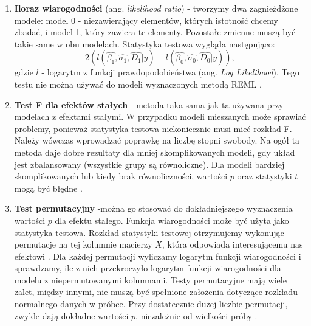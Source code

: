 \documentclass[12pt]{mwbk}
\theoremstyle{plain}
\theoremstyle{definition}
\theoremstyle{definition}
\begin{document}
\begin{enumerate}
	\item \textbf{Iloraz wiarogodności} (ang. \textit{likelihood ratio}) - tworzymy dwa zagnieżdżone modele: model 0 - niezawierający elementów, których istotność chcemy zbadać, i model 1, który zawiera te elementy. Pozostałe zmienne muszą być takie same w obu modelach.
	Statystyka testowa wygląda następująco:
	$$2(l(\hat{\beta_1}, \hat{\sigma_1}, \hat{D_1}|y)-l(\hat{\beta_0}, \hat{\sigma_0}, \hat{D_0}|y)),$$
	gdzie $l$ - logarytm z funkcji prawdopodobieństwa (ang. \textit{Log Likelihood}). Tego testu nie można używać do modeli wyznaczonych metodą REML \cite{faraway}.
	
	\item \textbf{Test F dla efektów stałych} - metoda taka sama jak ta używana przy modelach z efektami stałymi. W przypadku modeli mieszanych może sprawiać problemy, ponieważ statystyka testowa niekoniecznie musi mieć rozkład F. Należy wówczas wprowadzać poprawkę na liczbę stopni swobody. Na ogół ta metoda daje dobre rezultaty dla mniej skomplikowanych modeli, gdy układ jest zbalansowany (wszystkie grupy są równoliczne). Dla modeli bardziej skomplikowanych lub kiedy brak równoliczności, wartości $p$ oraz statystyki $t$ mogą być błędne \cite{faraway}.
	
	\item \textbf{Test permutacyjny} -można go stosować do dokładniejszego wyznaczenia wartości $p$ dla efektu stałego. Funkcja wiarogodności może być użyta jako statystyka testowa. Rozkład statystyki testowej otrzymujemy wykonując permutacje na tej kolumnie macierzy $X$, która odpowiada interesującemu nas efektowi \cite{biecek}. Dla każdej permutacji wyliczamy logarytm funkcji wiarogodności i sprawdzamy, ile z nich przekroczyło logarytm funkcji wiarogodności dla modelu z niepermutowanymi kolumnami. Testy permutacyjne mają wiele zalet, między innymi, nie muszą być spełnione założenia dotyczące rozkładu normalnego danych w próbce. Przy dostatecznie dużej liczbie permutacji, zwykle dają dokładne wartości $p$, niezależnie od wielkości próby \cite{bootstrap}.
	



\end{enumerate}
\end{document}
